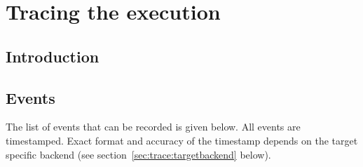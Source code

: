 \chapter{Tracing the execution}

\section{Introduction}

\section{Events}

The list of events that can be recorded is given below.
All events are timestamped.
Exact format and accuracy of the timestamp depends on the target specific
backend (see section~\ref{sec:trace:targetbackend} below).

